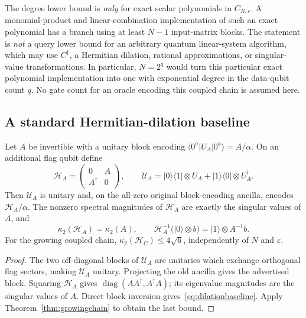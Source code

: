 \begin{remark}
The degree lower bound is \emph{only} for exact scalar polynomials in
$C_{N,\varepsilon}$. A monomial-product and linear-combination implementation
of such an exact polynomial has a branch using at least $N-1$ input-matrix
blocks. The statement is \emph{not} a query lower bound for an arbitrary
quantum linear-system algorithm, which may use $C^\dagger$, a Hermitian
dilation, rational approximations, or singular-value transformations.
In particular, $N=2^q$ would turn this particular exact polynomial
implementation into one with exponential degree in the data-qubit count $q$.
No gate count for an oracle encoding this coupled chain is assumed here.
\end{remark}

\subsection{A standard Hermitian-dilation baseline}
\begin{proposition}
\label{prop:hermitian_dilation}
Let $A$ be invertible with a unitary block encoding
$\langle0^a|U_A|0^a\rangle=A/\alpha$.
On an additional flag qubit define
\begin{equation}\label{eq:herm_dilation}
 \mathcal H_A=\begin{pmatrix}0&A\\A^\dagger&0\end{pmatrix},\qquad
 \mathcal U_A=|0\rangle\langle1|\otimes U_A
 +|1\rangle\langle0|\otimes U_A^\dagger.
\end{equation}
Then $\mathcal U_A$ is unitary and, on the all-zero original
block-encoding ancilla, encodes $\mathcal H_A/\alpha$.
The nonzero spectral magnitudes of $\mathcal H_A$ are exactly the singular
values of $A$, and
\begin{equation}\label{eq:dilationbaseline}
 \kappa_2(\mathcal H_A)=\kappa_2(A),\qquad
 \mathcal H_A^{-1}(|0\rangle\otimes b)
 =|1\rangle\otimes A^{-1}b.
\end{equation}
For the growing coupled chain, $\kappa_2(\mathcal H_C)\leq4\sqrt6$,
independently of $N$ and $\varepsilon$.
\end{proposition}
\begin{proof}
The two off-diagonal blocks of $\mathcal U_A$ are unitaries which
exchange orthogonal flag sectors, making $\mathcal U_A$ unitary.
Projecting the old ancilla gives the advertised block.
Squaring $\mathcal H_A$ gives
$\operatorname{diag}(AA^\dagger,A^\dagger A)$;
its eigenvalue magnitudes are the singular values of $A$.
Direct block inversion gives~\eqref{eq:dilationbaseline}.
Apply Theorem~\ref{thm:growingchain} to obtain the last bound.
\end{proof}
